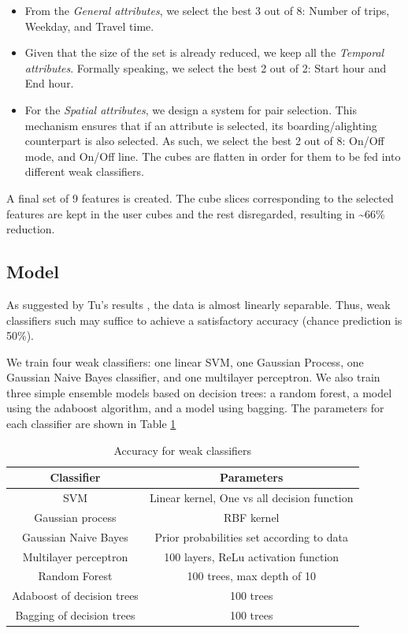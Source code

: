 \documentclass{article}
\begin{document}
\begin{itemize}

\item From the \textit{General attributes}, we select the best 3 out of 8: Number of trips, Weekday, and Travel time. 

\item Given that the size of the set is already reduced, we keep all the \textit{Temporal attributes}. Formally speaking, we select the best 2 out of 2: Start hour and End hour. 

\item For the \textit{Spatial attributes}, we design a system for pair selection. This mechanism ensures that if an attribute is selected, its boarding/alighting counterpart is also selected. As such, we select the best 2 out of 8: On/Off mode, and On/Off line. The cubes are flatten in order for them to be fed into different weak classifiers. 

\end{itemize}

A final set of 9 features is created. The cube slices corresponding to the selected features are kept in the user cubes and the rest disregarded, resulting in \textasciitilde 66\% reduction. 

\subsection{Model} 
As suggested by Tu's results \cite{tu2016impact}, the data is almost linearly separable. Thus, weak classifiers such may suffice to achieve a satisfactory accuracy (chance prediction is 50\%).

We train four weak classifiers: one linear SVM, one Gaussian Process, one Gaussian Naive Bayes classifier, and one multilayer perceptron. We also train three simple ensemble models based on decision trees: a random forest, a model using the adaboost algorithm, and a model using bagging. The parameters for each classifier are shown in Table \ref{table:classifiersParam}

\begin{table}[H]
\centering
\begin{tabular}{||c|c||}
\hline
\textbf{Classifier} & \textbf{Parameters} \\ [0.5ex] 
\hline \hline
SVM & Linear kernel, One vs all decision function \\
Gaussian process & RBF kernel\\
Gaussian Naive Bayes & Prior probabilities set according to data \\
Multilayer perceptron & 100 layers, ReLu activation function \\
Random Forest & 100 trees, max depth of 10 \\
Adaboost of decision trees & 100 trees \\
Bagging of decision trees & 100 trees\\ [1ex]
\hline 
\end{tabular}
\caption{Accuracy for weak classifiers}
\label{table:classifiersParam}
\end{table}
\end{document}
